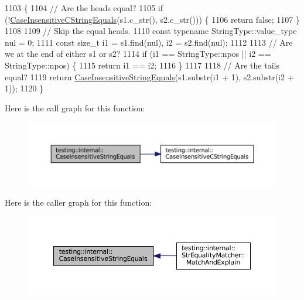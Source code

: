 \begin{DoxyCode}
1103                                                        \{
1104   \textcolor{comment}{// Are the heads equal?}
1105   \textcolor{keywordflow}{if} (!\hyperlink{namespacetesting_1_1internal_ad5b31f61a3cc5b4226d3560f5b48f4dd}{CaseInsensitiveCStringEquals}(s1.c\_str(), s2.c\_str())) \{
1106     \textcolor{keywordflow}{return} \textcolor{keyword}{false};
1107   \}
1108 
1109   \textcolor{comment}{// Skip the equal heads.}
1110   \textcolor{keyword}{const} \textcolor{keyword}{typename} StringType::value\_type nul = 0;
1111   \textcolor{keyword}{const} \textcolor{keywordtype}{size\_t} i1 = s1.find(nul), i2 = s2.find(nul);
1112 
1113   \textcolor{comment}{// Are we at the end of either s1 or s2?}
1114   \textcolor{keywordflow}{if} (i1 == StringType::npos || i2 == StringType::npos) \{
1115     \textcolor{keywordflow}{return} i1 == i2;
1116   \}
1117 
1118   \textcolor{comment}{// Are the tails equal?}
1119   \textcolor{keywordflow}{return} \hyperlink{namespacetesting_1_1internal_a383de24b1cca6648c14b03964c0ed843}{CaseInsensitiveStringEquals}(s1.substr(i1 + 1), s2.substr(i2 + 1));
1120 \}
\end{DoxyCode}
Here is the call graph for this function\+:
\nopagebreak
\begin{figure}[H]
\begin{center}
\leavevmode
\includegraphics[width=350pt]{namespacetesting_1_1internal_a383de24b1cca6648c14b03964c0ed843_cgraph}
\end{center}
\end{figure}
Here is the caller graph for this function\+:
\nopagebreak
\begin{figure}[H]
\begin{center}
\leavevmode
\includegraphics[width=350pt]{namespacetesting_1_1internal_a383de24b1cca6648c14b03964c0ed843_icgraph}
\end{center}
\end{figure}
\mbox{\label{namespacetesting_1_1internal_abfe9bfb020d38aa4e0e12c001911b22b}} 
